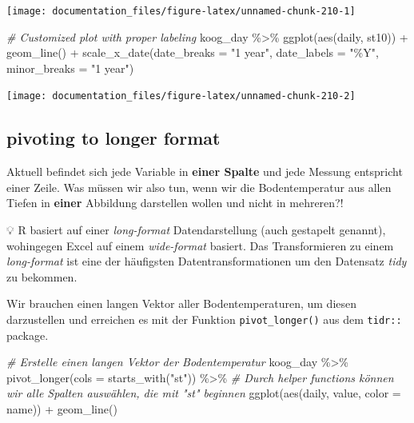 \documentclass[
]{article}
\newenvironment{Shaded}{\begin{snugshade}}{\end{snugshade}}
\newcommand{\AttributeTok}[1]{\textcolor[rgb]{0.77,0.63,0.00}{#1}}
\newcommand{\CommentTok}[1]{\textcolor[rgb]{0.56,0.35,0.01}{\textit{#1}}}
\newcommand{\FunctionTok}[1]{\textcolor[rgb]{0.00,0.00,0.00}{#1}}
\newcommand{\NormalTok}[1]{#1}
\newcommand{\SpecialCharTok}[1]{\textcolor[rgb]{0.00,0.00,0.00}{#1}}
\newcommand{\StringTok}[1]{\textcolor[rgb]{0.31,0.60,0.02}{#1}}
\begin{document}
\begin{center}\texttt{[image: documentation\_files/figure-latex/unnamed-chunk-210-1]} \end{center}

\begin{Shaded}
\begin{Highlighting}[]
\CommentTok{\# Customized plot with proper labeling}
\NormalTok{koog\_day }\SpecialCharTok{\%\textgreater{}\%}
  \FunctionTok{ggplot}\NormalTok{(}\FunctionTok{aes}\NormalTok{(daily, st10)) }\SpecialCharTok{+}
  \FunctionTok{geom\_line}\NormalTok{() }\SpecialCharTok{+}
  \FunctionTok{scale\_x\_date}\NormalTok{(}\AttributeTok{date\_breaks =} \StringTok{"1 year"}\NormalTok{, }\AttributeTok{date\_labels =} \StringTok{"\%Y"}\NormalTok{, }\AttributeTok{minor\_breaks =} \StringTok{"1 year"}\NormalTok{)}
\end{Highlighting}
\end{Shaded}

\begin{center}\texttt{[image: documentation\_files/figure-latex/unnamed-chunk-210-2]} \end{center}

\hypertarget{pivoting-to-longer-format}{%
\subsection{pivoting to longer format}\label{pivoting-to-longer-format}}

Aktuell befindet sich jede Variable in \textbf{einer Spalte} und jede Messung entspricht einer Zeile. Was müssen wir also tun, wenn wir die Bodentemperatur aus allen Tiefen in \textbf{einer} Abbildung darstellen wollen und nicht in mehreren?!

💡 R basiert auf einer \emph{long-format} Datendarstellung (auch gestapelt genannt), wohingegen Excel auf einem \emph{wide-format} basiert. Das Transformieren zu einem \emph{long-format} ist eine der häufigsten Datentransformationen um den Datensatz \emph{tidy} zu bekommen.

Wir brauchen einen langen Vektor aller Bodentemperaturen, um diesen darzustellen und erreichen es mit der Funktion \texttt{pivot\_longer()} aus dem \texttt{tidr::} package.

\begin{Shaded}
\begin{Highlighting}[]
\CommentTok{\# Erstelle einen langen Vektor der Bodentemperatur}
\NormalTok{koog\_day }\SpecialCharTok{\%\textgreater{}\%}
  \FunctionTok{pivot\_longer}\NormalTok{(}\AttributeTok{cols =} \FunctionTok{starts\_with}\NormalTok{(}\StringTok{"st"}\NormalTok{)) }\SpecialCharTok{\%\textgreater{}\%} \CommentTok{\# Durch helper functions können wir alle Spalten auswählen, die mit "st" beginnen}
  \FunctionTok{ggplot}\NormalTok{(}\FunctionTok{aes}\NormalTok{(daily, value, }\AttributeTok{color =}\NormalTok{ name)) }\SpecialCharTok{+}
  \FunctionTok{geom\_line}\NormalTok{()}
\end{Highlighting}
\end{Shaded}
\end{document}
